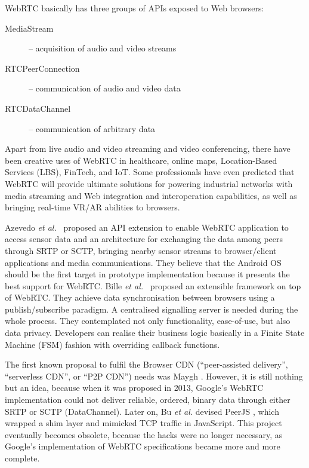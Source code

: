 WebRTC basically has three groups of APIs exposed to Web browsers: 
\begin{description}
	\item[MediaStream] 
	-- acquisition of audio and video streams
	\item[RTCPeerConnection] 
	-- communication of audio and video data
	\item[RTCDataChannel] 
	-- communication of arbitrary data
\end{description}

Apart from live audio and video streaming and video conferencing, there have been creative uses of WebRTC in healthcare, online maps, Location-Based Services (LBS), FinTech, and IoT. Some professionals have even predicted that WebRTC will provide ultimate solutions for powering industrial networks with media streaming and Web integration and interoperation capabilities, as well as bringing real-time VR/AR abilities to browsers. 

Azevedo {\em et al.}~\cite{Azevedo:2015:API} proposed an API extension to enable WebRTC application to access sensor data and an architecture for exchanging the data among peers through SRTP or SCTP, bringing nearby sensor streams to browser/client applications and media communications. They believe that the Android OS should be the first target in prototype implementation because it presents the best support for WebRTC. 
Bille {\em et al.}~\cite{Bille:2016:RTCSS} proposed an extensible framework on top of WebRTC. They achieve data synchronisation between browsers using a publish/subscribe paradigm. A centralised signalling server is needed during the whole process. They contemplated not only functionality, ease-of-use, but also data privacy. Developers can realise their business logic basically in a Finite State Machine (FSM) fashion with overriding callback functions.

The first known proposal to fulfil the Browser CDN (``peer-assisted delivery'', ``serverless CDN'', or ``P2P CDN'') needs was Maygh \cite{Zhang2013Maygh}. However, it is still nothing but an idea, because when it was proposed in 2013, Google's WebRTC implementation could not deliver reliable, ordered, binary data through either SRTP or SCTP (DataChannel). Later on, Bu {\em et al.} devised PeerJS \cite{bu2013peerjs}, which wrapped a shim layer and mimicked TCP traffic in JavaScript. This project eventually becomes obsolete, because the hacks were no longer necessary, as Google's implementation of WebRTC specifications became more and more complete. 

